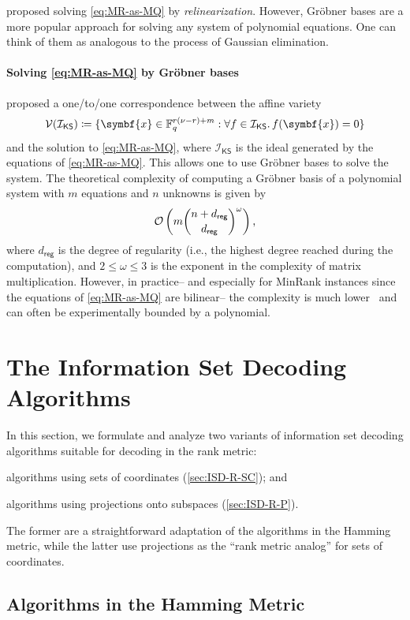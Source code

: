 \documentclass[version=last, paper=A4, parskip=half, oneside]{scrbook}
\theoremstyle{plain}
\theoremstyle{definition}
\theoremstyle{remark}
\renewcommand*{\vec}{\symbf}
\newcommand*{\FF}{\ensuremath{\mathbb{F}}}
\newcommand*{\reg}{\ensuremath{\mathsf{reg}}}
\newcommand*{\KS}{\ensuremath{\mathsf{KS}}}
\begin{document}
\Textcite{KS99} proposed solving \cref{eq:MR-as-MQ} by \emph{relinearization}.
However, Gröbner bases are a more popular approach for solving any system of
polynomial equations.  One can think of them as analogous to the process of
Gaussian elimination.

\paragraph{Solving \cref{eq:MR-as-MQ} by Gröbner bases} \Textcite{FLP08}
proposed a one\-/to\-/one correspondence between the affine variety
\[
  \mathcal{V}(\mathcal{I}_{\KS}) \coloneqq
  \{\vec{x} \in \FF_q^{r (\nu - r) + m} : \forall f \in \mathcal{I}_{\KS}\ldotp f(\vec{x}) = 0\}
\]
and the solution to \cref{eq:MR-as-MQ}, where \(\mathcal{I}_{\KS}\) is the ideal
generated by the equations of \cref{eq:MR-as-MQ}.  This allows one to use
Gröbner bases to solve the system.  The theoretical complexity of computing a
Gröbner basis of a polynomial system with \(m\) equations and \(n\) unknowns is
given by
\[
  \mathcal{O}\left(m \binom{n + d_{\reg}}{d_{\reg}}^{\omega}\right)\text,
\]
where \(d_{\reg}\) is the degree of regularity (i.e., the highest degree reached
during the computation), and \(2 \le \omega \le 3\) is the exponent in the
complexity of matrix multiplication.  However, in practice\--- and especially
for MinRank instances since the equations of \cref{eq:MR-as-MQ} are bilinear\---
the complexity is much lower~\cite{FLP08} and can often be experimentally
bounded by a polynomial.

\section{The Information Set Decoding Algorithms}

In this section, we formulate and analyze two variants of information set
decoding algorithms suitable for decoding in the rank metric:
\begin{enumerate*}[label={(\arabic*)}]
\item algorithms using sets of coordinates (\cref{sec:ISD-R-SC}); and
\item algorithms using projections onto subspaces (\cref{sec:ISD-R-P}).
\end{enumerate*}
The former are a straightforward adaptation of the algorithms in the Hamming
metric, while the latter use projections as the \enquote{rank metric analog}
for sets of coordinates.

\subsection{Algorithms in the Hamming Metric}\label{sec:ISD-H}
\end{document}
